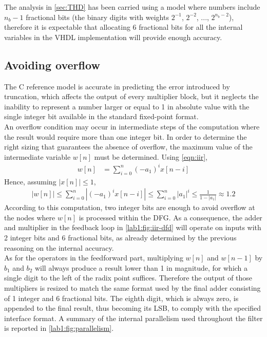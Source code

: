 The analysis in \autoref{sec:THD} has been carried using a model where numbers include $n_b-1$ fractional bits (the binary digits with weights $2^{-1}$, $2^{-2}$, ..., $2^{n_b-2}$), therefore it is expectable that allocating 6 fractional bits for all the internal variables in the VHDL implementation will provide enough accuracy.

\subsection{Avoiding overflow}
The C reference model is accurate in predicting the error introduced by truncation, which affects the output of every multiplier block, but it neglects the inability to represent a number larger or equal to 1 in absolute value with the single integer bit available in the standard fixed-point format.\\
An overflow condition may occur in intermediate steps of the computation where the result would require more than one integer bit. In order to determine the right sizing that guarantees the absence of overflow, the maximum value of the intermediate variable $w[n]$ must be determined. Using \autoref{eqn:iir},
\begin{align*}
	w[n] &= \sum_{i=0}^{n} (-a_1)^i x[n-i]
\end{align*}
Hence, assuming $|x[n]|\leq 1$,
\begin{align*}
	|w[n]|\leq
	\sum_{i=0}^{n} |(-a_1)^i x[n-i]| \leq
	\sum_{i=0}^{n} |a_1|^i \leq
	\frac{1}{1-|a_1|} \approx
	1.2
\end{align*}
According to this computation, two integer bits are enough to avoid overflow at the nodes where $w[n]$ is processed within the DFG. As a consequence, the adder and multiplier in the feedback loop in \autoref{lab1:fig:iir-dfd} will operate on inputs with 2 integer bits and 6 fractional bits, as already determined by the previous reasoning on the internal accuracy.\\
As for the operators in the feedforward part, multiplying $w[n]$ and $w[n-1]$ by $b_1$ and $b_2$ will always produce a result lower than 1 in magnitude, for which a single digit to the left of the radix point suffices. Therefore the output of those multipliers is resized to match the same format used by the final adder consisting of 1 integer and 6 fractional bits. The eighth digit, which is always zero, is appended to the final result, thus becoming its LSB, to comply with the specified interface format. A summary of the internal parallelism used throughout the filter is reported in \autoref{lab1:fig:parallelism}.

